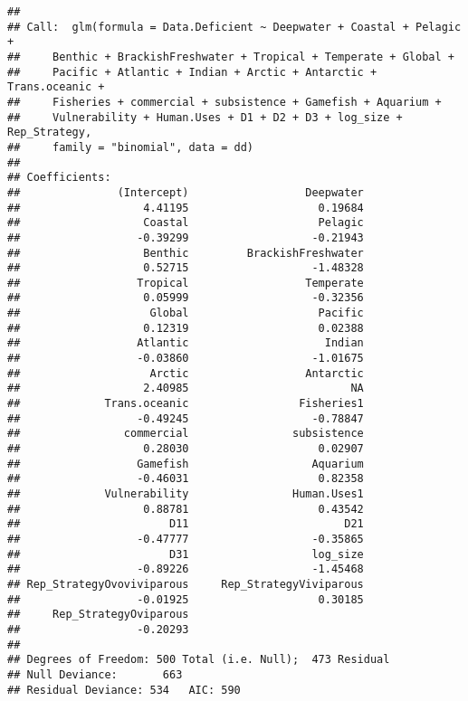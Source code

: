 \documentclass[]{article}
\begin{document}
\begin{verbatim}
## 
## Call:  glm(formula = Data.Deficient ~ Deepwater + Coastal + Pelagic + 
##     Benthic + BrackishFreshwater + Tropical + Temperate + Global + 
##     Pacific + Atlantic + Indian + Arctic + Antarctic + Trans.oceanic + 
##     Fisheries + commercial + subsistence + Gamefish + Aquarium + 
##     Vulnerability + Human.Uses + D1 + D2 + D3 + log_size + Rep_Strategy, 
##     family = "binomial", data = dd)
## 
## Coefficients:
##               (Intercept)                  Deepwater  
##                   4.41195                    0.19684  
##                   Coastal                    Pelagic  
##                  -0.39299                   -0.21943  
##                   Benthic         BrackishFreshwater  
##                   0.52715                   -1.48328  
##                  Tropical                  Temperate  
##                   0.05999                   -0.32356  
##                    Global                    Pacific  
##                   0.12319                    0.02388  
##                  Atlantic                     Indian  
##                  -0.03860                   -1.01675  
##                    Arctic                  Antarctic  
##                   2.40985                         NA  
##             Trans.oceanic                 Fisheries1  
##                  -0.49245                   -0.78847  
##                commercial                subsistence  
##                   0.28030                    0.02907  
##                  Gamefish                   Aquarium  
##                  -0.46031                    0.82358  
##             Vulnerability                Human.Uses1  
##                   0.88781                    0.43542  
##                       D11                        D21  
##                  -0.47777                   -0.35865  
##                       D31                   log_size  
##                  -0.89226                   -1.45468  
## Rep_StrategyOvoviviparous     Rep_StrategyViviparous  
##                  -0.01925                    0.30185  
##     Rep_StrategyOviparous  
##                  -0.20293  
## 
## Degrees of Freedom: 500 Total (i.e. Null);  473 Residual
## Null Deviance:       663 
## Residual Deviance: 534   AIC: 590
\end{verbatim}
\end{document}
